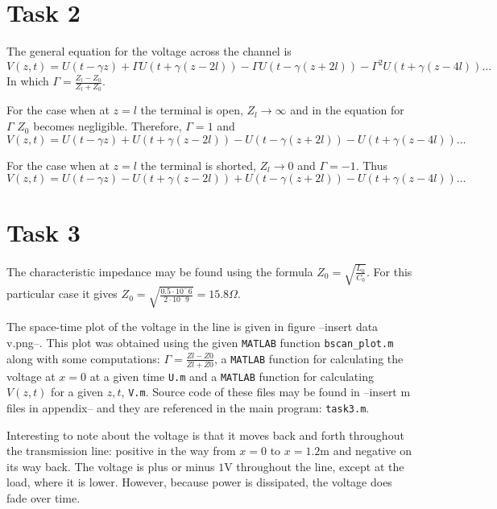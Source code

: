 \documentclass[11pt,titlepage]{report}
\begin{document}
\section{Task 2}
The general equation for the voltage across the channel is 
\begin{equation}
V(z,t)=U(t-\gamma z) + \Gamma U(t+\gamma(z-2l))-\Gamma U(t-\gamma(z+2l))-\Gamma^2U(t+\gamma(z-4l))\dots
\end{equation}
In which $\Gamma=\frac{Z_l-Z_0}{Z_l+Z_0}$.

For the case when at $z=l$ the terminal is open, $Z_l \to \infty$ and in the equation for $\Gamma$ $Z_0$ becomes negligible. Therefore, $\Gamma=1$ and 
\begin{equation}
V(z,t)=U(t-\gamma z) + U(t+\gamma(z-2l))- U(t-\gamma(z+2l))- U(t+\gamma(z-4l))\dots
\end{equation}

For the case when at $z=l$ the terminal is shorted, $Z_l \to 0$ and $\Gamma=-1$. Thus 
\begin{equation}
V(z,t)=U(t-\gamma z) - U(t+\gamma(z-2l))+U(t-\gamma(z+2l))-U(t+\gamma(z-4l))\dots
\end{equation}


\section{Task 3}
The characteristic impedance may be found using the formula $Z_0=\sqrt{\frac{L_0}{C_0}}$. For this particular case it gives $Z_0=\sqrt{\frac{0.5\cdot10^-6}{2\cdot10^-9}}=15.8\Omega$. 

The space-time plot of the voltage in the line is given in figure --insert data v.png--. This plot was obtained using the given \texttt{MATLAB} function \texttt{bscan\_plot.m} along with some computations: $\Gamma=\frac{Zl-Z0}{Zl+Z0}$, a \texttt{MATLAB} function for calculating the voltage at $x=0$ at a given time \texttt{U.m} and a \texttt{MATLAB} function for calculating $V(z,t)$ for a given $z,t$, \texttt{V.m}. Source code of these files may be found in --insert m files in appendix-- and they are referenced in the main program: \texttt{task3.m}.

Interesting to note about the voltage is that it moves back and forth throughout the transmission line: positive in the way from $x=0$ to $x=1.2$m and negative on its way back. The voltage is plus or minus $1 $V throughout the line, except at the load, where it is lower. However, because power is dissipated, the voltage does fade over time.
\end{document}
